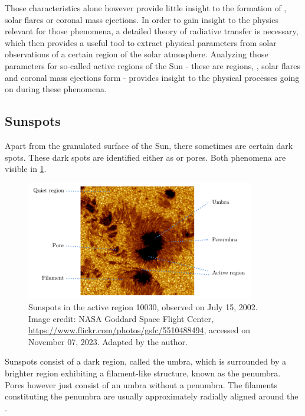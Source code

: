 \documentclass[a4paper,12pt]{report}
\def\lk#1{{\color{black}{#1}}}
\begin{document}
Those characteristics alone however provide little insight to the formation of \lk{sunspots}, solar flares or coronal mass ejections. In order to gain insight to the physics relevant for those phenomena, a detailed theory of radiative transfer is necessary, which then provides a useful tool to extract physical parameters from solar observations of a certain region of the solar atmosphere. Analyzing those parameters for so-called active regions of the Sun - these are regions, \lk{where sunspots}, solar flares and coronal mass ejections form - provides insight to the physical processes going on during these phenomena.

\subsection{Sunspots}
Apart from the granulated surface of the Sun, there sometimes are certain dark spots. These dark spots are identified either as \lk{sunspots} or pores. Both phenomena are visible in \cref{fig:Sunspots}.
\begin{figure}[h]
\centering
\includegraphics[width=10cm]{figures/Sunspots.pdf}
\caption{Sunspots in the active region 10030, observed on July 15, 2002. Image credit: NASA Goddard Space Flight Center, \url{https://www.flickr.com/photos/gsfc/5510488494}, accessed on November 07, 2023. Adapted by the author.}
\label{fig:Sunspots}
\end{figure}
Sunspots consist of a dark region, called the umbra, which is surrounded by a brighter region exhibiting a filament-like structure, known as the penumbra. Pores however just consist of an umbra without a penumbra. The filaments constituting the penumbra are usually approximately radially aligned around the \lk{sunspot}.
\end{document}
